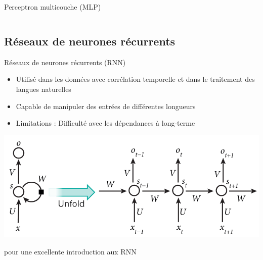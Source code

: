 \documentclass[french]{beamer}
\begin{document}
\begin{frame}{Perceptron multicouche (MLP)}
\begin{columns}[T]
\begin{column}{.52\textwidth}
\end{column}
\end{columns}
\end{frame}


\subsection{Réseaux de neurones récurrents}

\begin{frame}{Réseaux de neurones récurrents (RNN)}
\begin{itemize}
	\item Utilisé dans les données avec corrélation temporelle et dans le traitement des langues naturelles
	\item Capable de manipuler des entrées de différentes longueurs
	\item Limitations : Difficulté avec les dépendances à long-terme
\end{itemize}

\centering
\includegraphics[width=.8\textwidth]{figures/rnn}

\raggedright
\cite{karpathy2015unreasonable} pour une excellente introduction aux RNN

\end{frame}
\end{document}
